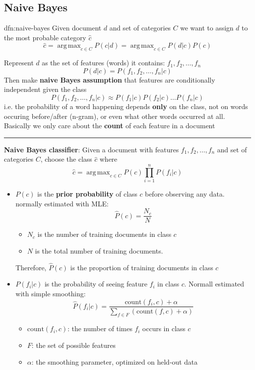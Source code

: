 \documentclass[landscape, 8pt]{extarticle}
\DeclareMathOperator*{\argmax}{arg\,max}
\begin{document}
\begin{multicols}{3}
\subsection{Naive Bayes}
\begin{dfn}{dfn:naive-bayes}{}
    \vspace{-5pt}
    Given document $d$ and set of categories $C$ we want to assign $d$ to the most probable category $\hat{c}$
    \[\hat{c} = \argmax_{c\in C} P(c | d) = \argmax_{c\in C} P(d|c)P(c)\]

    Represent $d$ as the set of features (words) it contains: $f_{1},f_{2},\dots,f_{n}$
    \[P(d | c) = P(f_{1},f_{2},\dots,f_{n} | c)\]
    Then make \textbf{naive Bayes assumption} that features are conditionally independent given the class
    \[P(f_{1},f_{2},\dots,f_{n}|c) \approx P(f_{1}|c) P(f_{2}|c)\dots P(f_{n}|c)\]
    i.e. the probability of a word happening depends \textbf{only} on the class, not on words occuring before/after (n-gram), or even what other words occurred at all. Basically we only care about the \textbf{count} of each feature in a document

    \vspace{-5pt}
    \noindent\rule{\textwidth}{0.2pt}
    \textbf{Naive Bayes classifier}: Given a document with features $f_{1},f_{2},\dots,f_{n}$ and set of categories $C$, choose the class $\hat{c}$ where
    \[\hat{c} = \argmax_{c\in C} P(c)\prod_{i=1}^{n}P(f_{i}|c)\]
    \begin{itemize}[leftmargin=*]
        \setlength\itemsep{0em}
        \item $P(c)$ is the \textbf{prior probability} of class $c$ before observing any data. normally estimated with MLE:
            \[\hat{P}(c) = \frac{N_{c}}{N}\]
            \begin{itemize}
                \setlength\itemsep{0em}
                \item $N_{c}$ is the number of training documents in class $c$
                \item $N$ is the total number of training documents. 
            \end{itemize}
            \vspace{-5pt}
            Therefore, $\hat{P}(c)$ is the proportion of training documents in class $c$
        \item $P(f_{i}|c)$ is the probability of seeing feature $f_{i}$ in class $c$. Normall estimated with simple smoothing:
            \[\hat{P}(f_{i}|c) = \frac{\text{count}(f_{i}, c) + \alpha}{\sum_{f\in F}(\text{count}(f, c) + \alpha)}\]
            \begin{itemize}
                \setlength\itemsep{0em}
                \item $\text{count}(f_{i}, c)$: the number of times $f_{i}$ occurs in class $c$
                \item $F$: the set of possible features
                \item $\alpha$: the smoothing parameter, optimized on held-out data
            \end{itemize}


\end{itemize}
\end{dfn}
\end{multicols}
\end{document}
